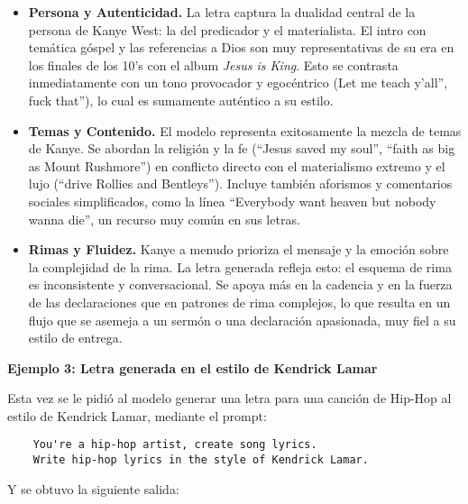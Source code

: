 \documentclass[paper=letter, fontsize=11pt, draft=false]{scrartcl}
\numberwithin{equation}{section} %
\numberwithin{figure}{section} %
\numberwithin{table}{section} %
\numberwithin{subsection}{section}
\begin{document}
\begin{itemize}
    \item \textbf{Persona y Autenticidad.} La letra captura la dualidad central de la persona de Kanye West: la del predicador y el materialista. El intro con temática góspel y las referencias a Dios son muy representativas de su era en los finales de los 10's con el album \textit{Jesus is King}. Esto se contrasta inmediatamente con un tono provocador y egocéntrico (Let me teach y'all'', fuck that''), lo cual es sumamente auténtico a su estilo.

    \item \textbf{Temas y Contenido.} El modelo representa exitosamente la mezcla de temas de Kanye. Se abordan la religión y la fe (``Jesus saved my soul'', ``faith as big as Mount Rushmore'') en conflicto directo con el materialismo extremo y el lujo (``drive Rollies and Bentleys''). Incluye también aforismos y comentarios sociales simplificados, como la línea ``Everybody want heaven but nobody wanna die'', un recurso muy común en sus letras.

    \item \textbf{Rimas y Fluidez.} Kanye a menudo prioriza el mensaje y la emoción sobre la complejidad de la rima. La letra generada refleja esto: el esquema de rima es inconsistente y conversacional. Se apoya más en la cadencia y en la fuerza de las declaraciones que en patrones de rima complejos, lo que resulta en un flujo que se asemeja a un sermón o una declaración apasionada, muy fiel a su estilo de entrega.
\end{itemize}


\textbf{Ejemplo 3: Letra generada en el estilo de Kendrick Lamar}

Esta vez se le pidió al modelo generar una letra para una canción de Hip-Hop al estilo de Kendrick Lamar, mediante el prompt:
    
\begin{verbatim}
    You're a hip-hop artist, create song lyrics. 
    Write hip-hop lyrics in the style of Kendrick Lamar.
\end{verbatim}

Y se obtuvo la siguiente salida:
\end{document}
